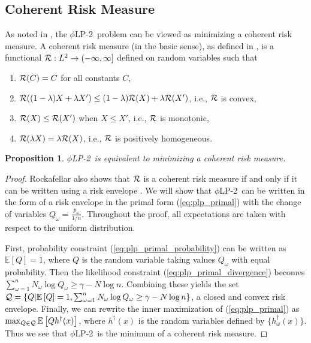 \documentclass[11pt]{article}
\newcommand{\E}{\mathbb{E}}
\newcommand{\e}[1]{\E \left[ #1 \right]}
\newtheorem{proposition}[theorem]{Proposition}
\newcommand{\plp}{$\phi$LP-2}
\begin{document}
\subsection{Coherent Risk Measure}
As noted in \cite{wang2010likelihood}, the \plp\ problem can be viewed as minimizing a coherent risk measure.
A coherent risk measure (in the basic sense), as defined in \cite{rockafellar2007coherent}, is a functional ${\cal R}: L^2 \rightarrow (-\infty,\infty]$ defined on random variables such that
\begin{enumerate}
	\item ${\cal R}(C) = C$ for all constants $C$,
	\item ${\cal R}((1-\lambda)X + \lambda X') \leq (1-\lambda){\cal R}(X) + \lambda {\cal R}(X')$, i.e., $\cal R$ is convex,
	\item ${\cal R}(X) \leq {\cal R}(X')$ when $X \leq X'$, i.e., $\cal R$ is monotonic,
	\item ${\cal R}(\lambda X) = \lambda {\cal R}(X)$, i.e., $\cal R$ is positively homogeneous.
\end{enumerate}

\begin{proposition}
	\plp\ is equivalent to minimizing a coherent risk measure.
\end{proposition}

\begin{proof}
	Rockafellar also shows that $\cal R$ is a coherent risk measure if and only if it can be written using a risk envelope \cite{rockafellar2007coherent}.
	We will show that \plp\ can be written in the form of a risk envelope in the primal form (\ref{eq:plp_primal}) with the change of variables $Q_\omega = \frac{p_\omega}{1/n}$.
	Throughout the proof, all expectations are taken with respect to the uniform distribution.
	
	First, probability constraint (\ref{eq:plp_primal_probability}) can be written as $\e{Q} = 1$, where $Q$ is the random variable taking values $Q_\omega$ with equal probability.
	Then the likelihood constraint (\ref{eq:plp_primal_divergence}) becomes $\sum_{\omega=1}^n N_\omega \log Q_\omega \geq \gamma - N \log n$.
	Combining these yields the set ${\cal Q} = \{Q | \e{Q} = 1, \sum_{\omega=1}^n N_\omega \log Q_\omega \geq \gamma - N \log n \}$, a closed and convex risk envelope.
	Finally, we can rewrite the inner maximization of (\ref{eq:plp_primal}) as $\max_{Q \in {\cal Q}} \e{Qh^\dagger(x)}$, where $h^\dagger(x)$ is the random variables defined by $\{h^\dagger_\omega(x)\}$.
	Thus we see that \plp\ is the minimum of a coherent risk measure.
\end{proof}
\end{document}
